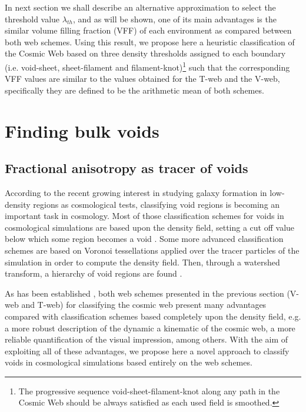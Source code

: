 \documentclass[a4,useAMS,usenatbib,usegraphicx]{latex/mn2e}
\begin{document}
In next section we shall describe an alternative approximation to select 
the threshold value $\lambda_{th}$, and as will be shown, one of its main 
advantages is the similar volume filling fraction (VFF) of each 
environment as compared between both web schemes. Using this result, we 
propose here a heuristic classification of the Cosmic Web based on 
three density thresholds assigned to each boundary (i.e. void-sheet, 
sheet-filament and filament-knot)\footnote{The progressive sequence 
void-sheet-filament-knot along any path in the Cosmic Web should be always
satisfied as each used field is smoothed.} such that the corresponding VFF 
values are similar to the values obtained for the T-web and the V-web, 
specifically they are defined to be the arithmetic mean of both schemes.


\section{Finding bulk voids}
\label{sec:bulk_voids}


\subsection{Fractional anisotropy as tracer of voids}
\label{subsec:FA_voids}


According to the recent growing interest in studying galaxy formation in 
low-density regions as cosmological tests, classifying void regions is 
becoming an important task in cosmology. Most of those classification 
schemes for voids in cosmological simulations are based upon the density 
field, setting a cut off value below which some region becomes a void 
\SRKED{[references]}. Some more advanced classification schemes are based 
on Voronoi tessellations applied over the tracer particles of the 
simulation in order to compute the density field. Then, through a watershed 
transform, a hierarchy of void regions are found .


As has been established \SRKED{[references]}, both web schemes presented 
in the previous section (V-web and T-web) for classifying the cosmic web 
present many advantages compared with classification schemes based
completely upon the density field, e.g. a more robust description of the
dynamic a kinematic of the cosmic web, a more reliable quantification of 
the visual impression, among others. With the aim of exploiting all of 
these advantages, we propose here a novel approach to classify voids in
cosmological simulations based entirely on the web schemes.
\end{document}
